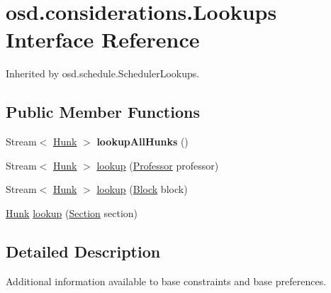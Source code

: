 \hypertarget{interfaceosd_1_1considerations_1_1_lookups}{\section{osd.\-considerations.\-Lookups Interface Reference}
\label{interfaceosd_1_1considerations_1_1_lookups}
}


Inherited by osd.\-schedule.\-Scheduler\-Lookups.

\subsection*{Public Member Functions}
\begin{DoxyCompactItemize}
\item 
\hypertarget{interfaceosd_1_1considerations_1_1_lookups_a79f815304368deb1c52f7aacb1f7a82a}{Stream$<$ \hyperlink{classosd_1_1output_1_1_hunk}{Hunk} $>$ {\bfseries lookup\-All\-Hunks} ()}\label{interfaceosd_1_1considerations_1_1_lookups_a79f815304368deb1c52f7aacb1f7a82a}

\item 
Stream$<$ \hyperlink{classosd_1_1output_1_1_hunk}{Hunk} $>$ \hyperlink{interfaceosd_1_1considerations_1_1_lookups_a59cce51ecd4a4d7759d75fe22764618e}{lookup} (\hyperlink{interfaceosd_1_1input_1_1_professor}{Professor} professor)
\item 
Stream$<$ \hyperlink{classosd_1_1output_1_1_hunk}{Hunk} $>$ \hyperlink{interfaceosd_1_1considerations_1_1_lookups_a3555d841515dc41635a5630b9fb9d2db}{lookup} (\hyperlink{interfaceosd_1_1input_1_1_block}{Block} block)
\item 
\hyperlink{classosd_1_1output_1_1_hunk}{Hunk} \hyperlink{interfaceosd_1_1considerations_1_1_lookups_a887396578bd66cac95589f68cfc2d50f}{lookup} (\hyperlink{interfaceosd_1_1input_1_1_section}{Section} section)
\end{DoxyCompactItemize}


\subsection{Detailed Description}
Additional information available to base constraints and base preferences. 

